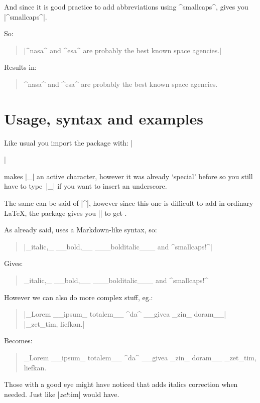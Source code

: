 \documentclass[11pt, cm-default]{l3doc}
\begin{document}
	And since it is good practice to add abbreviations using ^smallcaps^,
	 gives you |^smallcaps^|.
	
	So:
	\begin{quote}
		|^nasa^ and ^esa^ are probably the best known space agencies.|
	\end{quote}

	Results in:
	\begin{quote}
		^nasa^ and ^esa^ are probably the best known space agencies.
	\end{quote}


	\section{Usage, syntax and examples}
	Like usual you import the package with: |\usepackage{easyformat}|

	 makes |_| an active character, however it was already
	`special' before so you still have to type~|\_| if you want to insert
	an underscore.
	
	The same can be said of |^|, however since this one is difficult to add
	in ordinary \LaTeX, the  package gives you |\cir|
	to get \cir.
	
	\newpage

	As already said,  uses a Markdown-like syntax, so:
	
	\begin{quote}
		|_italic,_ __bold,__ ___bolditalic___ and ^smallcaps!^|
	\end{quote}

	Gives:
	\begin{quote}
		_italic,_ __bold,__ ___bolditalic___ and ^smallcaps!^
	\end{quote}

	However we can also do more complex stuff, eg.:
	\begin{quote}
		|_Lorem __ipsum_ totalem__ ^da^ __givea _zin_ doram__|\\
		|_zet_tim, liefkan.|
	\end{quote}
	
	Becomes:
	\begin{quote}
		_Lorem __ipsum_ totalem__ ^da^ __givea _zin_ doram__ _zet_tim, liefkan.
	\end{quote}

	Those with a good eye might have noticed that  adds
	italics correction when needed. Just like |\textit{zet}tim| would have.
\end{document}

